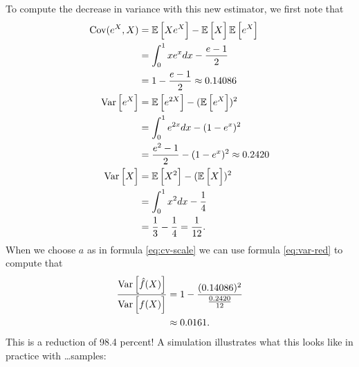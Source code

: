 To compute the decrease in variance with this new estimator, we first note that
\begin{align*}
  \operatorname{Cov}(e^X, X)
    &= \operatorname{\mathbb{E}} \Big[ Xe^X \Big] - \operatorname{\mathbb{E}} \Big[ X \Big]\operatorname{\mathbb{E}} \Big[ e^X \Big] \\
    &= \int_0^1 xe^x dx - \frac{e-1}{2} \\
    &= 1 - \frac{e-1}{2} \approx 0.14086 \\
  \operatorname{Var} \Big[ e^X \Big]
    &= \operatorname{\mathbb{E}} \Big[ e^{2X} \Big] - (\operatorname{\mathbb{E}} \Big[ e^X \Big])^2 \\
    &= \int_0^1 e^{2x} dx - (1 - e^x)^2 \\
    &= \frac{e^2 - 1}{2}  - (1 - e^x)^2 \approx 0.2420 \\
  \operatorname{Var} \Big[ X \Big] &= \operatorname{\mathbb{E}} \Big[ X^2 \Big] - (\operatorname{\mathbb{E}} \Big[ X \Big])^2 \\
    &= \int_0^1 x^2 dx - \frac{1}{4} \\
    &= \frac{1}{3} - \frac{1}{4} = \frac{1}{12}.
\end{align*}
When we choose $a$ as in formula \ref{eq:cv-scale} we can use formula \ref{eq:var-red} to compute that
\begin{align*}
  \frac{ \operatorname{Var} \Big[ \hat{f}(X) \Big] }{ \operatorname{Var} \Big[ f(X) \Big]}
    &= 1 - \frac{(0.14086)^2}{\frac{0.2420}{12}} \\
    &\approx 0.0161.
\end{align*}
This is a reduction of 98.4 percent! A simulation illustrates what this looks like in practice with \dots samples:
